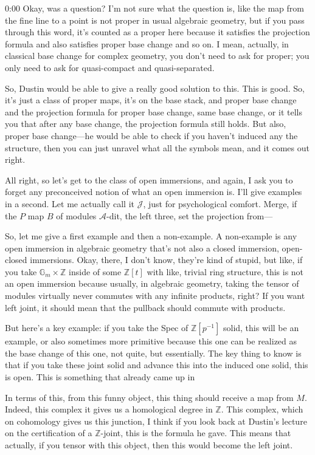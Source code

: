 \begin{unfinished}{0:00}
Okay, was a question? I'm not sure what the question is, like the map from the fine line to a point is not proper in usual algebraic geometry, but if you pass through this word, it's counted as a proper here because it satisfies the projection formula and also satisfies proper base change and so on. I mean, actually, in classical base change for complex geometry, you don't need to ask for proper; you only need to ask for quasi-compact and quasi-separated.

So, Dustin would be able to give a really good solution to this. This is good. So, it's just a class of proper maps, it's on the base stack, and proper base change and the projection formula for proper base change, same base change, or it tells you that after any base change, the projection formula still holds. But also, proper base change---he would be able to check if you haven't induced any the structure, then you can just unravel what all the symbols mean, and it comes out right.

All right, so let's get to the class of open immersions, and again, I ask you to forget any preconceived notion of what an open immersion is. I'll give examples in a second. Let me actually call it $\mathcal{J}$, just for psychological comfort. Merge, if the $P$ map $B$ of modules $\mathcal{A}$-dit, the left three, set the projection from---

So, let me give a first example and then a non-example. A non-example is any open immersion in algebraic geometry that's not also a closed immersion, open-closed immersions. Okay, there, I don't know, they're kind of stupid, but like, if you take $\mathbb{G}_m \times \mathbb{Z}$ inside of some $\mathbb{Z}[t]$ with like, trivial ring structure, this is not an open immersion because usually, in algebraic geometry, taking the tensor of modules virtually never commutes with any infinite products, right? If you want left joint, it should mean that the pullback should commute with products.

But here's a key example: if you take the Spec of $\mathbb{Z}[p^{-1}]$ solid, this will be an example, or also sometimes more primitive because this one can be realized as the base change of this one, not quite, but essentially. The key thing to know is that if you take these joint solid and advance this into the induced one solid, this is open. This is something that already came up in

In terms of this, from this funny object, this thing should receive a map from $M$. Indeed, this complex it gives us a homological degree in $\mathbb{Z}$. This complex, which on cohomology gives us this junction, I think if you look back at Dustin's lecture on the certification of a $\mathbb{Z}$-joint, this is the formula he gave. This means that actually, if you tensor with this object, then this would become the left joint. 


\end{unfinished}
